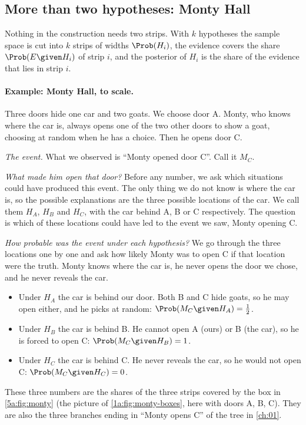 \subsection{More than two hypotheses: Monty Hall}

Nothing in the construction needs two strips. With $k$ hypotheses the sample
space is cut into $k$ strips of widths $\Prob(H_i)$, the evidence covers the
share $\Prob(E\given H_i)$ of strip $i$, and the posterior of $H_i$ is the share
of the evidence that lies in strip $i$.

\paragraph{Example: Monty Hall, to scale.}
Three doors hide one car and two goats. We choose door A. Monty, who knows where
the car is, always opens one of the two other doors to show a goat, choosing at
random when he has a choice. Then he opens door C.

\emph{The event.} What we observed is ``Monty opened door C''. Call it $M_C$.

\emph{What made him open that door?} Before any number, we ask which situations
could have produced this event. The only thing we do not know is where the car is,
so the possible explanations are the three possible locations of the car.
We call them $H_A$, $H_B$ and $H_C$, with the car behind A, B or C respectively.
The question is which of these locations could have led to the event we saw,
Monty opening C.

\emph{How probable was the event under each hypothesis?} We go through the three
locations one by one and ask how likely Monty was to open C if that location were
the truth. Monty knows where the car is, he never opens the door we chose, and he
never reveals the car.
\begin{itemize}[itemsep=1pt,leftmargin=1.2em]
  \item Under $H_A$ the car is behind our door. Both B and C hide goats, so he may
        open either, and he picks at random: $\Prob(M_C\given H_A)=\frac12$.
  \item Under $H_B$ the car is behind B. He cannot open A (ours) or B (the car), so
        he is forced to open C: $\Prob(M_C\given H_B)=1$.
  \item Under $H_C$ the car is behind C. He never reveals the car, so he would not
        open C: $\Prob(M_C\given H_C)=0$.
\end{itemize}
These three numbers are the shares of the three strips covered by the box in
\cref{5a:fig:monty} (the picture of \cref{1a:fig:monty-boxes}, here with doors A, B,
C). They are also the three branches ending in ``Monty opens
C'' of the tree in \cref{ch:01}.

